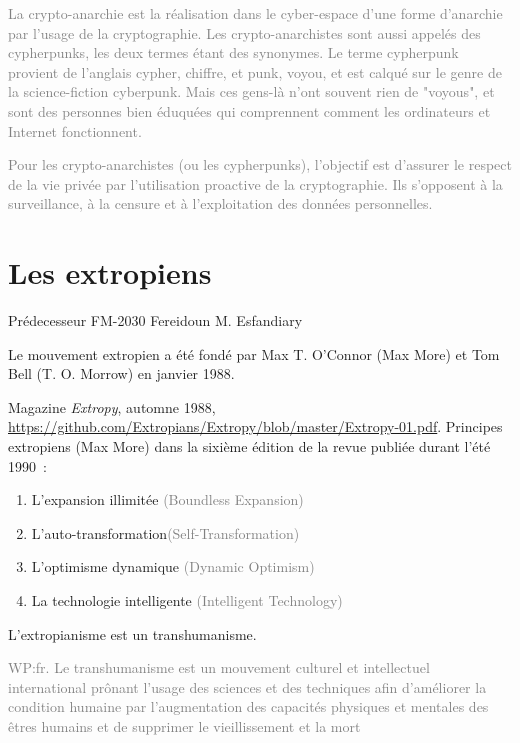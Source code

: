 \textcolor{gray}{La crypto-anarchie est la réalisation dans le cyber-espace d'une forme d'anarchie par l'usage de la cryptographie. Les crypto-anarchistes sont aussi appelés des cypherpunks, les deux termes étant des synonymes. Le terme cypherpunk provient de l'anglais cypher, chiffre, et punk, voyou, et est calqué sur le genre de la science-fiction cyberpunk. Mais ces gens-là n'ont souvent rien de "voyous", et sont des personnes bien éduquées qui comprennent comment les ordinateurs et Internet fonctionnent.}

\textcolor{gray}{Pour les crypto-anarchistes (ou les cypherpunks), l'objectif est d'assurer le respect de la vie privée par l'utilisation proactive de la cryptographie. Ils s'opposent à la surveillance, à la censure et à l'exploitation des données personnelles.}







\section{Les extropiens}

Prédecesseur FM-2030 Fereidoun M. Esfandiary

Le mouvement extropien a été fondé par Max T. O'Connor (Max More) et Tom Bell (T. O. Morrow) en janvier 1988.

Magazine \emph{Extropy}, automne 1988, \url{https://github.com/Extropians/Extropy/blob/master/Extropy-01.pdf}. Principes extropiens (Max More) dans la sixième édition de la revue publiée durant l'été 1990~:

\begin{enumerate}[(1)]
    \item L'expansion illimitée \textcolor{gray}{(Boundless Expansion)}
    \item L'auto-transformation\textcolor{gray}{(Self-Transformation)}
    \item L'optimisme dynamique \textcolor{gray}{(Dynamic Optimism)}
    \item La technologie intelligente \textcolor{gray}{(Intelligent Technology)}
\end{enumerate}

L'extropianisme est un transhumanisme.

\textcolor{gray}{WP:fr. Le transhumanisme est un mouvement culturel et intellectuel international prônant l'usage des sciences et des techniques afin d'améliorer la condition humaine par l'augmentation des capacités physiques et mentales des êtres humains et de supprimer le vieillissement et la mort}

